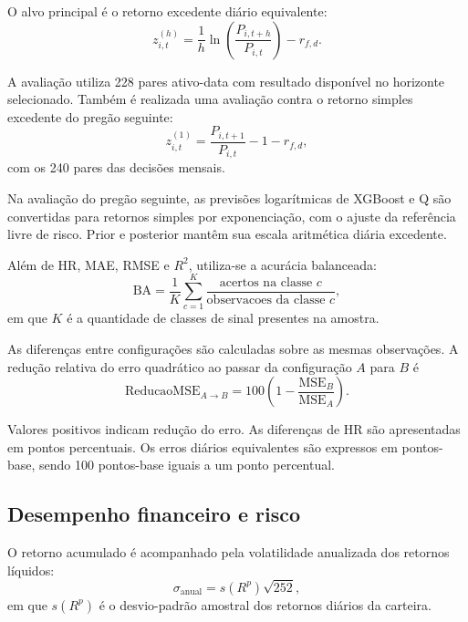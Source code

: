 O alvo principal é o retorno excedente diário
equivalente:
\begin{equation}
z_{i,t}^{(h)}
=
\frac{1}{h}
\ln\left(
\frac{P_{i,t+h}}{P_{i,t}}
\right)
-
r_{f,d}.
\label{eq:alvo_diario_camadas}
\end{equation}

A avaliação utiliza 228 pares ativo-data com
resultado disponível no horizonte selecionado.
Também é realizada uma avaliação contra o
retorno simples excedente do pregão seguinte:
\begin{equation}
z_{i,t}^{(1)}
=
\frac{P_{i,t+1}}{P_{i,t}}
-1-r_{f,d},
\label{eq:alvo_pregao_seguinte}
\end{equation}
com os 240 pares das decisões mensais.

Na avaliação do pregão seguinte, as previsões
logarítmicas de XGBoost e Q são convertidas
para retornos simples por exponenciação,
com o ajuste da referência livre de risco.
Prior e posterior mantêm sua escala aritmética
diária excedente.

Além de HR, MAE, RMSE e $R^2$, utiliza-se
a acurácia balanceada:
\begin{equation}
\mathrm{BA}
=
\frac{1}{K}
\sum_{c=1}^{K}
\frac{
\text{acertos na classe }c
}{
\text{observacoes da classe }c
},
\label{eq:acuracia_balanceada}
\end{equation}
em que $K$ é a quantidade de classes de sinal
presentes na amostra.

As diferenças entre configurações são calculadas
sobre as mesmas observações. A redução relativa
do erro quadrático ao passar da configuração
$A$ para $B$ é
\begin{equation}
\mathrm{ReducaoMSE}_{A\rightarrow B}
=
100\left(
1-\frac{\mathrm{MSE}_B}{\mathrm{MSE}_A}
\right).
\label{eq:reducao_mse_camadas}
\end{equation}

Valores positivos indicam redução do erro.
As diferenças de HR são apresentadas em pontos
percentuais. Os erros diários equivalentes
são expressos em pontos-base, sendo
100 pontos-base iguais a um ponto percentual.

\subsection{Desempenho financeiro e risco}

O retorno acumulado é acompanhado pela
volatilidade anualizada dos retornos líquidos:
\begin{equation}
\sigma_{\mathrm{anual}}
=
s(R^p)\sqrt{252},
\label{eq:volatilidade_anual}
\end{equation}
em que $s(R^p)$ é o desvio-padrão amostral
dos retornos diários da carteira.

